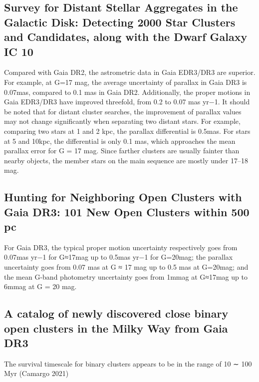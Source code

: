 \documentclass[../Main.tex]{subfiles}
\begin{document}
{\subsection{Survey for Distant Stellar Aggregates in the Galactic Disk: Detecting 2000 Star Clusters and Candidates, along with the Dwarf Galaxy IC 10} %
Compared with Gaia DR2, the astrometric data in Gaia EDR3/DR3 are superior. For example, at G=17 mag, the average uncertainty of parallax in Gaia DR3 is 0.07mas, compared to 0.1 mas in Gaia DR2. Additionally, the proper motions in Gaia EDR3/DR3 have improved threefold, from 0.2 to 0.07 mas yr−1. It should be noted that for distant cluster searches, the improvement of parallax values may not change significantly when separating two distant stars. For example, comparing two stars at 1 and 2 kpc, the parallax differential is 0.5mas. For stars at 5 and 10kpc, the differential is only 0.1 mas, which approaches the mean parallax error for G = 17 mag. Since farther clusters are usually fainter than nearby objects, the member stars on the main sequence are mostly under 17–18 mag. 
\subsection{Hunting for Neighboring Open Clusters with Gaia DR3: 101 New Open Clusters within 500 pc} %
For Gaia DR3, the typical proper motion uncertainty respectively goes from 0.07mas yr−1 for G≈17mag up to 0.5mas yr−1 for G=20mag; the parallax uncertainty goes from 0.07 mas at G ≈ 17 mag up to 0.5 mas at G=20mag; and the mean G-band photometry uncertainty goes from 1mmag at G≈17mag up to 6mmag at G = 20 mag.

\subsection{A catalog of newly discovered close binary open clusters in the Milky Way from Gaia DR3} %
The survival timescale for binary clusters appears to be in the range of 10 ∼ 100 Myr (Camargo 2021)


}
\end{document}
